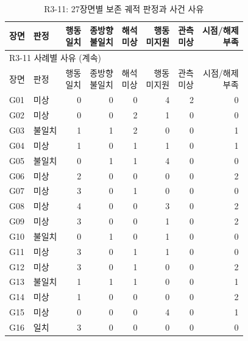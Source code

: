\begingroup
\fontsize{8.5pt}{11.5pt}\selectfont
\setlength{\tabcolsep}{4pt}
\begin{longtable}{llrrrrrr}
\caption{R3-11: 27장면별 보존 궤적 판정과 사건 사유}\label{tab:response-trajectory-details}\\
\toprule
장면 & 판정 & \shortstack{행동\\일치} & \shortstack{종방향\\불일치} & \shortstack{해석\\미상} & \shortstack{행동\\미지원} & \shortstack{관측\\미상} & \shortstack{시점/해제\\부족} \\
\midrule
\endfirsthead
\multicolumn{8}{l}{R3-11 사례별 사유 (계속)}\\
\toprule
장면 & 판정 & \shortstack{행동\\일치} & \shortstack{종방향\\불일치} & \shortstack{해석\\미상} & \shortstack{행동\\미지원} & \shortstack{관측\\미상} & \shortstack{시점/해제\\부족} \\
\midrule
\endhead
\bottomrule
\endfoot
G01 & 미상 & 0 & 0 & 0 & 4 & 2 & 0 \\
G02 & 미상 & 0 & 0 & 2 & 1 & 0 & 0 \\
G03 & 불일치 & 1 & 1 & 2 & 0 & 0 & 1 \\
G04 & 미상 & 1 & 0 & 1 & 1 & 0 & 1 \\
G05 & 불일치 & 0 & 1 & 1 & 4 & 0 & 0 \\
G06 & 미상 & 2 & 0 & 0 & 0 & 0 & 2 \\
G07 & 미상 & 3 & 0 & 1 & 0 & 0 & 0 \\
G08 & 미상 & 4 & 0 & 0 & 3 & 0 & 2 \\
G09 & 미상 & 3 & 0 & 0 & 1 & 0 & 2 \\
G10 & 불일치 & 0 & 1 & 0 & 1 & 0 & 0 \\
G11 & 미상 & 3 & 0 & 1 & 1 & 0 & 0 \\
G12 & 미상 & 3 & 0 & 1 & 0 & 0 & 2 \\
G13 & 불일치 & 1 & 1 & 1 & 0 & 0 & 1 \\
G14 & 미상 & 1 & 0 & 0 & 0 & 0 & 2 \\
G15 & 미상 & 0 & 0 & 0 & 4 & 0 & 1 \\
G16 & 일치 & 3 & 0 & 0 & 0 & 0 & 0 \\

\end{longtable}
